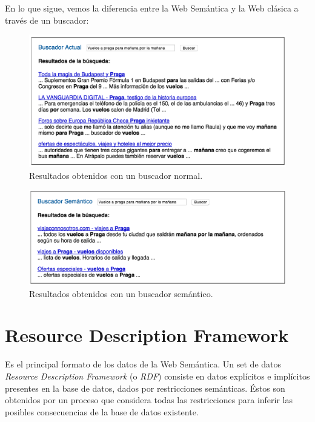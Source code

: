 \documentclass[10pt,a4paper]{article}
\begin{document}
En lo que sigue, vemos la diferencia entre la Web Semántica y la Web clásica a través de un buscador:

\begin{figure}[H] %
\begin{center}
\includegraphics[width=400pt]{imgs/resultadoNormal}
\caption{Resultados obtenidos con un buscador normal.}
\end{center}
\end{figure}
\begin{figure}[H] %
\begin{center}
\includegraphics[width=400pt]{imgs/resultadoSemantico}
\caption{Resultados obtenidos con un buscador semántico.}
\end{center}
\end{figure}

\section{Resource Description Framework}
Es el principal formato de los datos de la Web Semántica. Un set de datos \textit{Resource Description Framework} (o \textit{RDF}) consiste en datos explícitos e implícitos presentes en la base de datos, dados por restricciones semánticas. Éstos son obtenidos por un proceso que considera todas las restricciones para inferir las posibles consecuencias de la base de datos existente.
\end{document}
